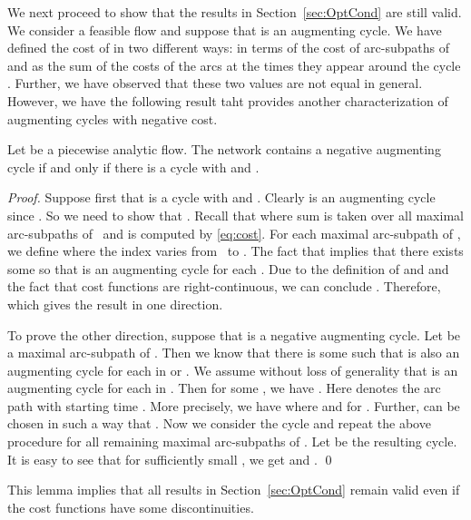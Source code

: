 \documentclass{svjour3}                     \smartqed
\begin{document}
We next proceed to show that the results in Section~\ref{sec:OptCond} are still valid. We consider a feasible flow  and suppose that  is an augmenting cycle. We have defined the cost of  in two different ways:  in terms of the cost of arc-subpaths of  and  as the sum of the costs of the arcs at the times they appear around the cycle . Further, we have observed that these two values are not equal in general. However, we have the following result taht provides another characterization of augmenting cycles with negative cost.

\begin{lemma}
\label{lem:neg-aug-cycle}
Let  be a piecewise analytic flow. The network  contains a negative augmenting cycle if and only if there is a cycle  with  and \mbox{}.
\end{lemma}
\begin{proof}
Suppose first that  is a cycle with  and . Clearly  is an augmenting cycle since . So we need to show that . Recall that  where sum is taken over all maximal arc-subpaths  of~ and  is computed by \eqref{eq:cost}. For each maximal arc-subpath  of , we define  where the index  varies from~ to . The fact that  implies that there exists some  so that  is an augmenting cycle for each . Due to the definition of  and  and the fact that cost functions are right-continuous, we can conclude . Therefore,  which gives the result in one direction.

To prove the other direction, suppose that  is a negative augmenting cycle. Let  be a maximal arc-subpath of . Then we know that there is some  such that  is also an augmenting cycle for each  in  or . We assume without loss of generality that  is an augmenting cycle for each  in . Then for some , we have . Here  denotes the arc path  with starting time . More precisely, we have  where  and  for .
Further,  can be chosen in such a way that . Now we consider the cycle  and repeat the above procedure for all remaining maximal arc-subpaths of . Let  be the resulting cycle. It is easy to see that for sufficiently small , we get  and .
\qed
\end{proof}

This lemma  implies that all results in Section~\ref{sec:OptCond} remain valid even if the cost functions have some discontinuities.
\end{document}
